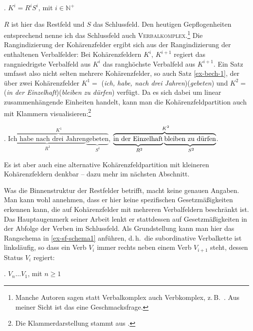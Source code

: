 \ex. $K^i = R^i S^i$, mit $i \in \mathbb{N}^+$ \label{ex-kf-schema}

$R$ ist hier das Restfeld und $S$ das Schlussfeld. Den heutigen Gepflogenheiten entsprechend nenne ich das Schlussfeld auch \textsc{Verbalkomplex}.\footnote{Manche Autoren sagen statt Verbalkomplex auch Verbkomplex, z.\,B.\ \cite{Vogel:09}. Aus meiner Sicht ist das eine Geschmacksfrage.} Die Rangindizierung der Kohärenzfelder ergibt sich aus der Rangindizierung der enthaltenen Verbalfelder: Bei Kohärenzfeldern $K^i$, $K^{i+1}$ regiert das rangniedrigste Verbalfeld aus $K^i$ das ranghöchste Verbalfeld aus $K^{i+1}$. Ein Satz umfasst also nicht selten mehrere Kohärenzfelder, so auch Satz \ref{ex-bech-1}, der über zwei Kohärenzfelder $K^1 =$ ({\it ich, habe, nach drei Jahren})({\it gebeten}) und $K^2 =$ ({\it in der Einzelhaft})({\it bleiben zu dürfen}) verfügt. Da es sich dabei um linear zusammenhängende Einheiten handelt, kann man die Kohärenzfeldpartition auch mit Klammern visualisieren:\footnote{Die Klammerdarstellung stammt aus \citet[Kapitel~17]{Mueller:99}.}

\ex. $\overbrace{\underbrace{\text{Ich habe nach drei Jahren}}_{~R^1} \underbrace{\text{gebeten}}_{~S^1}}^{~K^1}$, $\overbrace{\underbrace{\text{\phantom{g}\!\!\!in der Einzelhaft}}_{~R^2} \underbrace{\text{\phantom{g}\!\!\!bleiben {zu dürfen}}}_{~S^2}}^{~K^2}$.

Es ist aber auch eine alternative Kohärenzfeldpartition mit kleineren Kohärenzfeldern denkbar -- dazu mehr im nächsten Abschnitt. 

Was die Binnenstruktur der Restfelder betrifft, macht \cite{Bech:55} keine genauen Angaben. Man kann wohl annehmen, dass er hier keine spezifischen Gesetzmä\ss igkeiten erkennen kann, die auf Kohärenzfelder mit mehreren Verbalfeldern beschränkt ist. Das Hauptaugenmerk seiner Arbeit lenkt er stattdessen auf Gesetzmä\ss igkeiten in der Abfolge der Verben im Schlussfeld. Als Grundstellung kann man hier das Rangschema in \ref{ex-sf-schema1} anführen, d.\,h.\ die subordinative Verbalkette ist linksläufig, so dass ein Verb $V_{i}$ immer rechts neben einem Verb $V_{i+1}$ steht, dessen Status $V_i$ regiert:

\ex. $V_n \ldots V_1$, mit $n \geq 1$ \label{ex-sf-schema1}

